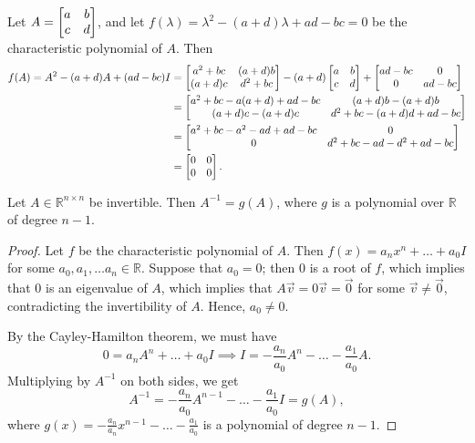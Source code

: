 \documentclass{homework}
\begin{document}
	\maketitle
	
	\question Let $A = \left[\begin{matrix}a&b\\c&d\end{matrix}\right]$, and let $f(\lambda) = \lambda^2 -(a+d)\lambda + ad -bc = 0$ be the characteristic polynomial of $A$. Then
	\begin{equation*}
	\begin{aligned}
		f(A) = A^2 - (a+d)A + (ad-bc)I &= \left[\begin{matrix}a^2 + bc & (a+d)b \\ (a+d)c & d^2 + bc\end{matrix}\right] -(a+d)\left[\begin{matrix}a&b\\c&d\end{matrix}\right] + \left[\begin{matrix}ad-bc & 0 \\ 0 & ad-bc\end{matrix}\right] \\
		&= \left[\begin{matrix}a^2 +bc-a(a+d) + ad-bc & (a+d)b - (a+d)b \\ (a+d)c - (a+d)c & d^2+bc - (a+d)d + ad-bc\end{matrix}\right] \\
		& = \left[\begin{matrix}a^2 +bc - a^2 -ad+ad-bc & 0 \\0 & d^2+bc-ad-d^2+ad-bc\end{matrix}\right] \\
		& =\left[\begin{matrix}0 & 0 \\ 0 & 0\end{matrix}\right].
	\end{aligned}
	\end{equation*}
	
	\question Let $A \in \mathbb{R}^{n\times n}$ be invertible. Then $A^{-1} = g(A)$, where $g$ is a polynomial over $\mathbb{R}$ of degree $n-1$.
	
	\begin{proof}
		Let $f$ be the characteristic polynomial of $A$. Then $f(x) = a_nx^n + \dots + a_0I$ for some $a_0, a_1, \dots a_n \in \mathbb{R}$. Suppose that $a_0 = 0$; then $0$ is a root of $f$, which implies that $0$ is an eigenvalue of $A$, which implies that $A\vec{v} = 0\vec{v} = \vec{0}$ for some $\vec{v} \ne \vec{0}$, contradicting the invertibility of $A$. Hence, $a_0 \ne 0$.
		
		By the Cayley-Hamilton theorem, we must have
		\begin{equation*}
			0 = a_nA^n + \dots +a_0I \implies I = -\frac{a_n}{a_0}A^n - \dots - \frac{a_1}{a_0}A.
		\end{equation*}
		Multiplying by $A^{-1}$ on both sides, we get
		\begin{equation*}
			A^{-1} = -\frac{a_n}{a_0}A^{n-1} - \dots - \frac{a_1}{a_0}I = g(A),
		\end{equation*}
		where $g(x) = -\frac{a_n}{a_n}x^{n-1} -\dots-\frac{a_1}{a_0}$ is a polynomial of degree $n-1$.
	\end{proof}
	
\end{document}
